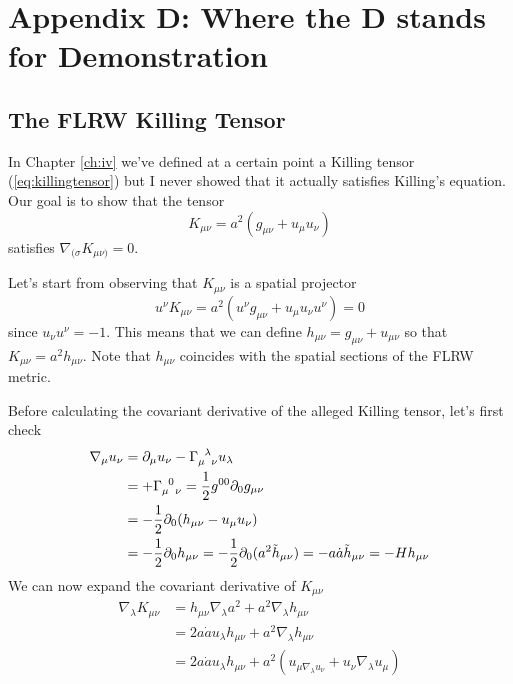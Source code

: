 \newpage

\section*{Appendix D: Where the D stands for Demonstration}

\subsection*{The FLRW Killing Tensor}

In Chapter \ref{ch:iv} we've defined at a certain point a Killing tensor (\ref{eq:killingtensor}) but I never showed that it actually satisfies Killing's equation. Our goal is to show that the tensor
\begin{equation}
    K_{\mu\nu} = a^{2}(g_{\mu\nu}+u_{\mu}u_{\nu})
\end{equation}
satisfies $\nabla_{(\sigma}K_{\mu\nu)} = 0$.
\par Let's start from observing that $K_{\mu\nu}$ is a spatial projector
\begin{equation}
    u^{\nu}K_{\mu\nu} = a^{2}(u^{\nu}g_{\mu\nu} + u_{\mu}u_{\nu}u^{\nu}) = 0
\end{equation}
since $u_{\nu}u^{\nu} = -1$. This means that we can define $h_{\mu\nu} = g_{\mu\nu}+u_{\mu\nu}$ so that $K_{\mu\nu} = a^{2}h_{\mu\nu}$. Note that $h_{\mu\nu}$ coincides with the spatial sections of the FLRW metric.
\par Before calculating the covariant derivative of the alleged Killing tensor, let's first check
\begin{align*}
    \nabla_{\mu}u_{\nu} &= \partial_{\mu}u_{\nu} - \Gamma_{\mu\;\;\nu}^{\;\;\lambda}u_{\lambda}\\
    &= +\Gamma_{\mu\;\;\nu}^{\;\;0} = \frac{1}{2}g^{00}\partial_{0}g_{\mu\nu}\\
    &= -\frac{1}{2}\partial_{0}(h_{\mu\nu}-u_{\mu}u_{\nu})\\
    &= -\frac{1}{2}\partial_{0}h_{\mu\nu} = -\frac{1}{2}\partial_{0}(a^{2}\tilde{h}_{\mu\nu}) = -a\dot{a}\tilde{h}_{\mu\nu} = -Hh_{\mu\nu}
\end{align*}
We can now expand the covariant derivative of $K_{\mu\nu}$
\begin{align*}
    \nabla_{\lambda}K_{\mu\nu} &= h_{\mu\nu}\nabla_{\lambda}a^{2}+a^{2}\nabla_{\lambda}h_{\mu\nu}\\
    &= 2a\dot{a}u_{\lambda}h_{\mu\nu} + a^{2}\nabla_{\lambda}h_{\mu\nu}\\
    &= 2a\dot{a}u_{\lambda}h_{\mu\nu} + a^{2}(u_{\mu\nabla_{\lambda}u_{\nu}}+u_{\nu}\nabla_{\lambda}u_{\mu})
\end{align*}
